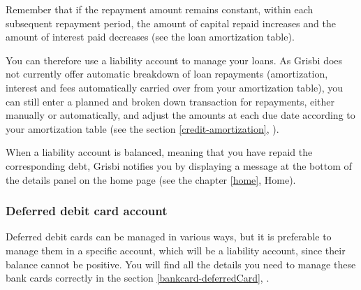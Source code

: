 Remember that if the repayment amount remains constant, within each subsequent repayment period, the amount of capital repaid increases and the amount of interest paid decreases (see the loan amortization table).

You can therefore use a liability account to manage your loans. As Grisbi does not currently offer automatic breakdown of loan repayments (amortization, interest and fees automatically carried over from your amortization table), you can still enter a planned and broken down transaction for repayments, either manually or automatically, and adjust the amounts at each due date according to your amortization table (see the section \vref{credit-amortization}, ).

When a liability account is balanced, meaning that you have repaid the corresponding debt, Grisbi notifies you by displaying a message at the bottom of the details panel on the home page (see the chapter \vref{home}, Home). %




\subsubsection{Deferred debit card account\label{accounts-type-cash-deferredCards}}
Deferred debit cards can be managed in various ways, but it is preferable to manage them in a specific account, which will be a liability account, since their balance cannot be positive.
You will find all the details you need to manage these bank cards correctly in the section \vref{bankcard-deferredCard}, .


